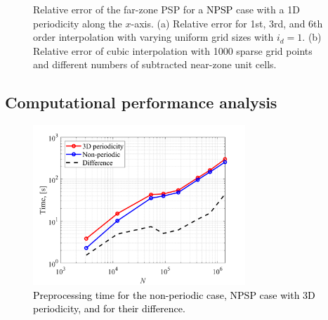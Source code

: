 \documentclass{article}
\begin{document}
\begin{figure}[htbp] \label{fig:error}
    \centering
    \quad
    \caption{Relative error of the far-zone PSP for a \textcolor{black}{NPSP} case with a 1D periodicity along the $x$-axis. (a) Relative error for 1st, 3rd, and 6th order interpolation with varying uniform grid sizes with $i_d=1$. (b) Relative error of cubic interpolation with 1000 sparse grid points and different numbers of subtracted near-zone unit cells.} \label{fig:error}
\end{figure}

\subsection{Computational performance analysis} \label{ssec:4.2}

\begin{figure}[htbp] 
\includegraphics[width=8cm]{preprocess.png}
\centering
\caption{\textcolor{black}{Preprocessing time for the non-periodic case, NPSP case with 3D periodicity, and for their difference.}} \label{fig:preprocess}
\end{figure}
\end{document}
